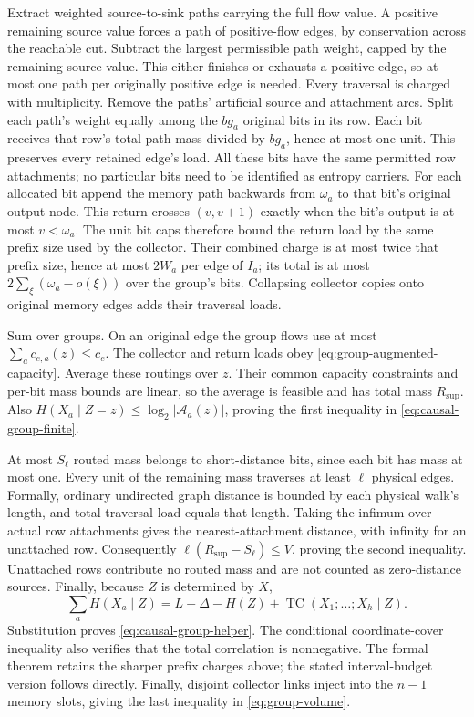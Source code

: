 \begin{outline}
Extract weighted source-to-sink paths carrying the full flow value.
A positive remaining source value forces a path of positive-flow edges,
by conservation across the reachable cut. Subtract the largest permissible
path weight, capped by the remaining source value. This either finishes
or exhausts a positive edge, so at most one path per originally positive
edge is needed. Every traversal is charged with multiplicity.
Remove the paths' artificial source and attachment arcs.
Split each path's weight equally among the $bg_a$ original bits in its row.
Each bit receives that row's total path mass divided by $bg_a$, hence at
most one unit. This preserves every retained edge's load. All these bits
have the same permitted row attachments; no particular bits need to be
identified as entropy carriers.
For each allocated bit append the memory path backwards from
$\omega_a$ to that bit's original output node. This return crosses
$(v,v+1)$ exactly when the bit's output is at most $v<\omega_a$.
The unit bit caps therefore bound the return load by the same prefix
size used by the collector. Their combined charge is at most twice
that prefix size, hence at most $2W_a$ per edge of $I_a$; its total is
at most $2\sum_\xi(\omega_a-o(\xi))$ over the group's bits. Collapsing
collector copies onto original memory edges adds their traversal loads.

Sum over groups.  On an original edge the group flows use at most
$\sum_a c_{e,a}(z)\le c_e$.  The collector and return loads obey
\cref{eq:group-augmented-capacity}.  Average these routings over $z$.
Their common capacity constraints and per-bit mass bounds are linear,
so the average is feasible and has total mass $R_{\mathrm{sup}}$.
Also $H(X_a\mid Z=z)\le\log_2|\mathcal A_a(z)|$, proving the
first inequality in \cref{eq:causal-group-finite}.

At most $S_\ell$ routed mass belongs to short-distance bits, since each
bit has mass at most one.  Every unit of the remaining mass traverses
at least $\ell$ physical edges. Formally, ordinary undirected graph
distance is bounded by each physical walk's length, and total traversal
load equals that length. Taking the infimum over actual row attachments
gives the nearest-attachment distance, with infinity for an unattached row.
Consequently
$\ell(R_{\mathrm{sup}}-S_\ell)\le V$, proving the second inequality.
Unattached rows contribute no routed mass and are not counted as
zero-distance sources.  Finally, because $Z$ is determined by $X$,
\[
 \sum_aH(X_a\mid Z)
 =L-\Delta-H(Z)+\operatorname{TC}(X_1;\ldots;X_h\mid Z).
\]
Substitution proves \cref{eq:causal-group-helper}.
The conditional coordinate-cover inequality also verifies that the total
correlation is nonnegative. The formal theorem retains the sharper prefix
charges above; the stated interval-budget version follows directly.
Finally, disjoint collector links inject into the $n-1$ memory slots,
giving the last inequality in \cref{eq:group-volume}.
\end{outline}

